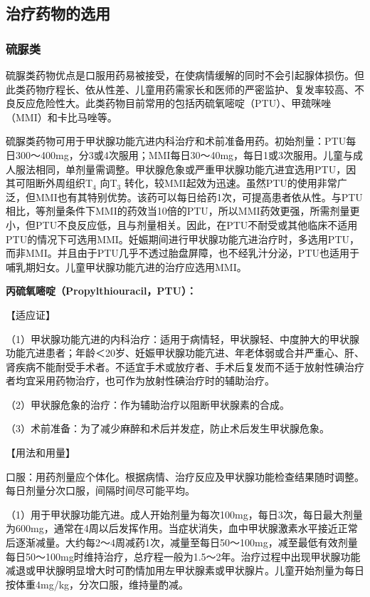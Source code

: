 \subsection{治疗药物的选用}

\subsubsection{硫脲类}

硫脲类药物优点是口服用药易被接受，在使病情缓解的同时不会引起腺体损伤。但此类药物疗程长、依从性差、儿童用药需家长和医师的严密监护、复发率较高、不良反应危险性大。此类药物目前常用的包括丙硫氧嘧啶（PTU）、甲巯咪唑（MMI）和卡比马唑等。

硫脲类药物可用于甲状腺功能亢进内科治疗和术前准备用药。初始剂量：PTU每日300～400mg，分3或4次服用；MMI每日30～40mg，每日1或3次服用。儿童与成人服法相同，单剂量需调整。甲状腺危象或严重甲状腺功能亢进宜选用PTU，因其可阻断外周组织T$_{4}$
向T$_{3}$
转化，较MMI起效为迅速。虽然PTU的使用非常广泛，但MMI也有其特别优势。该药可以每日给药1次，可提高患者依从性。与PTU相比，等剂量条件下MMI的药效当10倍的PTU，所以MMI药效更强，所需剂量更小，但PTU不良反应低，且与剂量相关。因此，在PTU不耐受或其他临床不适用PTU的情况下可选用MMI。妊娠期间进行甲状腺功能亢进治疗时，多选用PTU，而非MMI。并且由于PTU几乎不透过胎盘屏障，也不经乳汁分泌，PTU也适用于哺乳期妇女。儿童甲状腺功能亢进的治疗应选用MMI。

\textbf{丙硫氧嘧啶（Propylthiouracil，PTU）：}

【适应证】

（1）甲状腺功能亢进的内科治疗：适用于病情轻，甲状腺轻、中度肿大的甲状腺功能亢进患者；年龄＜20岁、妊娠甲状腺功能亢进、年老体弱或合并严重心、肝、肾疾病不能耐受手术者。不适宜手术或放疗者、手术后复发而不适于放射性碘治疗者均宜采用药物治疗，也可作为放射性碘治疗时的辅助治疗。

（2）甲状腺危象的治疗：作为辅助治疗以阻断甲状腺素的合成。

（3）术前准备：为了减少麻醉和术后并发症，防止术后发生甲状腺危象。

【用法和用量】

口服：用药剂量应个体化。根据病情、治疗反应及甲状腺功能检查结果随时调整。每日剂量分次口服，间隔时间尽可能平均。

（1）用于甲状腺功能亢进。成人开始剂量为每次100mg，每日3次，每日最大剂量为600mg，通常在4周以后发挥作用。当症状消失，血中甲状腺激素水平接近正常后逐渐减量。大约每2～4周减药1次，减量至每日50～100mg，减至最低有效剂量每日50～100mg时维持治疗，总疗程一般为1.5～2年。治疗过程中出现甲状腺功能减退或甲状腺明显增大时可酌情加用左甲状腺素或甲状腺片。儿童开始剂量为每日按体重4mg/kg，分次口服，维持量酌减。


